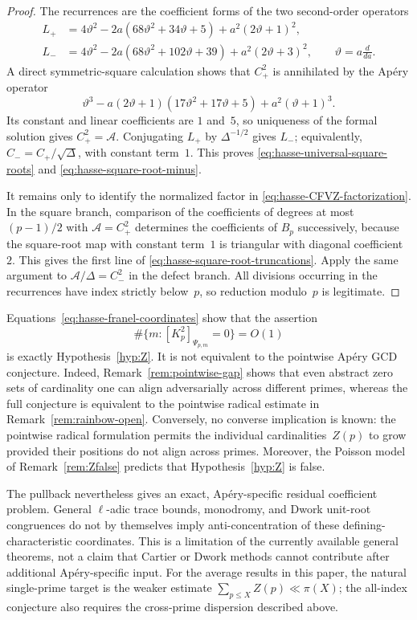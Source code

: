\begin{proof}
The recurrences are the coefficient forms of the two second-order
operators
\begin{align*}
 L_+&=4\vartheta^2
 -2a(68\vartheta^2+34\vartheta+5)+a^2(2\vartheta+1)^2,\\
 L_-&=4\vartheta^2
 -2a(68\vartheta^2+102\vartheta+39)+a^2(2\vartheta+3)^2,
 \qquad \vartheta=a\frac{d}{da}.
\end{align*}
A direct symmetric-square calculation shows that $C_+^2$ is annihilated by
the Ap\'ery operator
\[
 \vartheta^3-a(2\vartheta+1)(17\vartheta^2+17\vartheta+5)
 +a^2(\vartheta+1)^3.
\]
Its constant and linear coefficients are $1$ and~$5$, so uniqueness of the
formal solution gives $C_+^2=\mathcal A$.  Conjugating $L_+$ by
$\Delta^{-1/2}$ gives $L_-$; equivalently,
$C_-=C_+/\sqrt\Delta$, with constant term~$1$.  This proves
\eqref{eq:hasse-universal-square-roots} and
\eqref{eq:hasse-square-root-minus}.

It remains only to identify the normalized factor in
\eqref{eq:hasse-CFVZ-factorization}.  In the square branch, comparison of
the coefficients of degrees at most $(p-1)/2$ with
$\mathcal A=C_+^2$ determines the coefficients of $B_p$ successively,
because the square-root map with constant term~$1$ is triangular with
diagonal coefficient~$2$.  This gives the first line of
\eqref{eq:hasse-square-root-truncations}.  Apply the same argument to
$\mathcal A/\Delta=C_-^2$ in the defect branch.  All divisions occurring
in the recurrences have index strictly below~$p$, so reduction modulo~$p$
is legitimate.
\end{proof}

\begin{remark}
\label{rem:hasse-franel-logical-status}
Equations~\eqref{eq:hasse-franel-coordinates} show that the assertion
\[
 \#\{m:[K_p^2]_{\Psi_{p,m}}=0\}=O(1)
\]
is exactly Hypothesis~\ref{hyp:Z}.  It is not equivalent to the pointwise
Ap\'ery GCD conjecture.  Indeed, Remark~\ref{rem:pointwise-gap} shows that
even abstract zero sets of cardinality one can align adversarially across
different primes, whereas the full conjecture is equivalent to the
pointwise radical estimate in Remark~\ref{rem:rainbow-open}.  Conversely,
no converse implication is known: the pointwise radical formulation permits
the individual cardinalities~$Z(p)$ to grow provided their positions do not
align across primes.  Moreover, the Poisson model of
Remark~\ref{rem:Zfalse} predicts that Hypothesis~\ref{hyp:Z} is false.

The pullback nevertheless gives an exact, Ap\'ery-specific residual
coefficient problem.  General $\ell$-adic trace bounds, monodromy, and
Dwork unit-root congruences do not by themselves imply anti-concentration
of these defining-characteristic coordinates.  This is a limitation of the
currently available general theorems, not a claim that Cartier or Dwork
methods cannot contribute after additional Ap\'ery-specific input.  For
the average results in this paper, the natural single-prime target is the
weaker estimate $\sum_{p\leq X}Z(p)\ll\pi(X)$; the all-index conjecture also
requires the cross-prime dispersion described above.
\end{remark}
